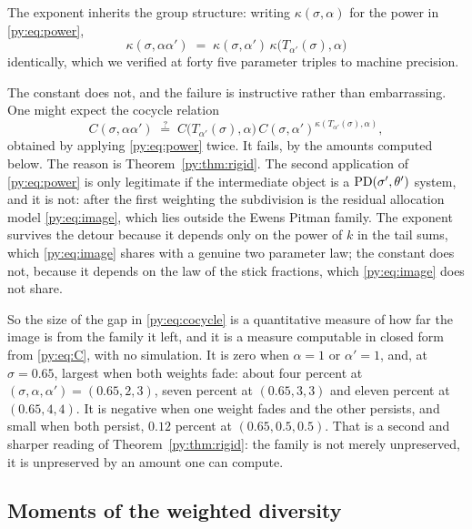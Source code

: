 The exponent inherits the group structure: writing $\kappa(\sigma,\alpha)$ for the power in
\eqref{py:eq:power},
\begin{equation}
\kappa(\sigma,\alpha\alpha') \;=\; \kappa(\sigma,\alpha')\,\kappa\big(T_{\alpha'}(\sigma),\alpha\big)
\label{py:eq:kappacomp}
\end{equation}
identically, which we verified at forty five parameter triples to machine precision.

The constant does not, and the failure is instructive rather than embarrassing. One might expect
the cocycle relation
\begin{equation}
C(\sigma,\alpha\alpha') \;\overset{?}{=}\; C\big(T_{\alpha'}(\sigma),\alpha\big)\,
C(\sigma,\alpha')^{\kappa(T_{\alpha'}(\sigma),\alpha)},
\label{py:eq:cocycle}
\end{equation}
obtained by applying \eqref{py:eq:power} twice. It fails, by the amounts computed below. The reason is Theorem~\ref{py:thm:rigid}. The second application of
\eqref{py:eq:power} is only legitimate if the intermediate object is a $\mathrm{PD}(\sigma',\theta')$ system,
and it is not: after the first weighting the subdivision is the residual allocation model
\eqref{py:eq:image}, which lies outside the Ewens Pitman family. The exponent survives the detour
because it depends only on the power of $k$ in the tail sums, which \eqref{py:eq:image} shares with a
genuine two parameter law; the constant does not, because it depends on the law of the stick
fractions, which \eqref{py:eq:image} does not share.

So the size of the gap in \eqref{py:eq:cocycle} is a quantitative measure of how far the image is from
the family it left, and it is a measure computable in closed form from \eqref{py:eq:C}, with no
simulation. It is zero when $\alpha = 1$ or $\alpha' = 1$, and, at $\sigma = 0.65$, largest when both weights fade:
about four percent at $(\sigma,\alpha,\alpha') = (0.65, 2, 3)$, seven percent at $(0.65, 3, 3)$ and eleven percent at $(0.65, 4, 4)$. It is negative when one weight fades and the other persists, and small when both persist, $0.12$ percent at $(0.65, 0.5, 0.5)$. That is a second and
sharper reading of Theorem~\ref{py:thm:rigid}: the family is not merely unpreserved, it is
unpreserved by an amount one can compute.

\subsection{Moments of the weighted diversity}
\label{py:sec:moments}

